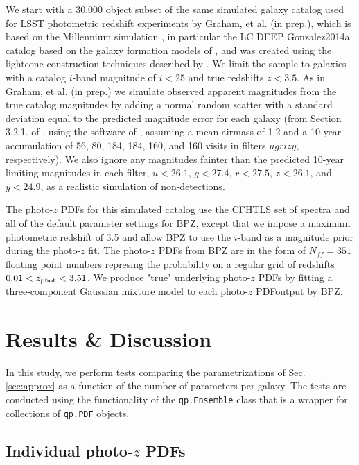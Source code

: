 \documentclass[\docopts]{\docclass}
\newcommand{\pz}{photo-$z$ PDF}
\begin{document}
We start with a 30,000 object subset of the same simulated galaxy catalog used 
for LSST photometric redshift experiments by Graham, et al. (in prep.), which 
is based on the Millennium simulation \citep{springel_simulations_2005}, in 
particular the LC DEEP Gonzalez2014a
catalog based on the galaxy formation models of \cite{gonzalez-perez_how_2014}, 
and was created using the lightcone construction techniques described by 
\cite{merson_lightcone_2013}.  We limit the sample to galaxies with a catalog 
$i$-band magnitude of $i<25$ and true redshifts $z<3.5$. As in Graham, et al. 
(in prep.) we simulate observed apparent magnitudes from the true catalog 
magnitudes by adding a normal random scatter with a standard deviation equal to 
the predicted magnitude error for each galaxy (from Section 3.2.1. of 
\citealt{ivezic_lsst:_2008}, using the software of 
\citealt{connolly_end--end_2014}, assuming a mean airmass of 1.2 and a 10-year 
accumulation of 56, 80, 184, 184, 160, and 160 visits in filters $ugrizy$, 
respectively).  We also ignore any magnitudes fainter than the predicted 
10-year limiting magnitudes in each filter, $u<26.1$, $g<27.4$, $r<27.5$, 
$z<26.1$, and $y<24.9$, as a realistic simulation of non-detections.

The \pz s for this simulated catalog use the CFHTLS set of spectra 
\citep{ilbert_accurate_2006} and all of the default parameter settings for BPZ, 
except that we impose a maximum photometric redshift of 3.5 and allow BPZ to 
use the $i$-band as a magnitude prior during the photo-$z$ fit. The \pz s from 
BPZ are in the form of $N_{ff} = 351$ floating point numbers represing the 
probability on a regular grid of redshifts $0.01 < z_{\rm phot} < 3.51$.  We 
produce "true" underlying \pz s by fitting a three-component Gaussian mixture 
model to each \pz output by BPZ.



\section{Results \& Discussion}
\label{sec:results}


In this study, we perform tests comparing the parametrizations of Sec. 
\ref{sec:approx} as a function of the number of parameters per galaxy.  The 
tests are conducted using the functionality of the \texttt{qp.Ensemble} class 
that is a wrapper for collections of \texttt{qp.PDF} objects.

\subsection{Individual \pz s}
\label{sec:individual}
\end{document}
